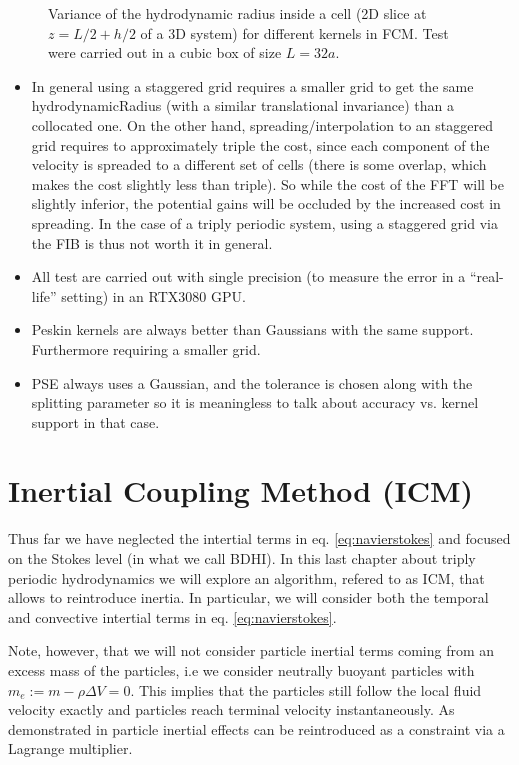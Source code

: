 \documentclass[ twoside,openright,titlepage,numbers=noenddot,%
headinclude,footinclude,cleardoublepage=empty,abstract=on,
BCOR=5mm,paper=a4,fontsize=11pt, dvipsnames
]{scrreprt}
\newcommand{\gpu}{\gls{GPU}\xspace}
\begin{document}
\begin{figure}
  \caption{Variance of the hydrodynamic radius inside a cell (2D slice at $z=L/2+h/2$ of a 3D system) for different kernels in \gls{FCM}. Test were carried out in a cubic box of size $L=32a$.}
\end{figure}

\begin{itemize}
\item In general using a staggered grid requires a smaller grid to get the same hydrodynamicRadius (with a similar translational invariance) than a collocated one. On the other hand, spreading/interpolation to an staggered grid requires to approximately triple the cost, since each component of the velocity is spreaded to a different set of cells (there is some overlap, which makes the cost slightly less than triple). So while the cost of the FFT will be slightly inferior, the potential gains will be occluded by the increased cost in spreading. In the case of a triply periodic system, using a staggered grid via the \gls{FIB} is thus not worth it in general.
\item All test are carried out with single precision (to measure the error in a ``real-life'' setting) in an RTX3080 \gpu.
\item Peskin kernels are always better than Gaussians with the same support. Furthermore requiring a smaller grid.
\item PSE always uses a Gaussian, and the tolerance is chosen along with the splitting parameter so it is meaningless to talk about accuracy vs. kernel support in that case.
\end{itemize}


\section{Inertial Coupling Method (ICM)}\label{ch:icm}
Thus far we have neglected the intertial terms in eq. \eqref{eq:navierstokes} and focused on the Stokes level (in what we call \gls{BDHI}). In this last chapter about triply periodic hydrodynamics we will explore an algorithm, refered to as \gls{ICM}\cite{Balboa2014}, that allows to reintroduce inertia. In particular, we will consider both the temporal and convective intertial terms in eq. \eqref{eq:navierstokes}.

Note, however, that we will not consider particle inertial terms coming from an excess mass of the particles, i.e we consider neutrally buoyant particles with $m_e := m - \rho\Delta V = 0$. This implies that the particles still follow the local fluid velocity exactly and particles reach terminal velocity instantaneously. As demonstrated in \cite{Balboa2014} particle inertial effects can be reintroduced as a constraint via a Lagrange multiplier.
\end{document}
